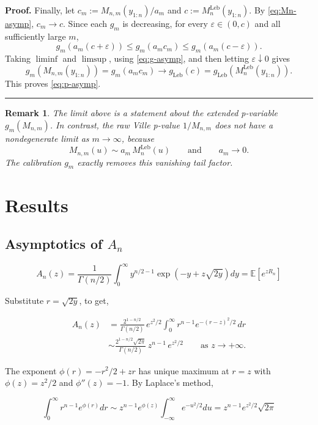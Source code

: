 \documentclass{article}%
\newtheorem{remark}[theorem]{Remark}
\newenvironment{proof}[1][Proof]{\noindent\textbf{#1.} }{\ \rule{0.5em}{0.5em}}
\begin{document}
\begin{proof}
Finally, let $c_m:=M_{n,m}(y_{1:n})/a_m$ and $c:=M_n^{\mathrm{Leb}}(y_{1:n})$. By \eqref{eq:Mn-asymp}, $c_m\to c$. Since each $g_m$ is decreasing, for every $\varepsilon\in(0,c)$ and all sufficiently large $m$,
\[
g_m(a_m(c+\varepsilon))
\le
g_m(a_m c_m)
\le
g_m(a_m(c-\varepsilon)).
\]
Taking $\liminf$ and $\limsup$, using \eqref{eq:g-asymp}, and then letting $\varepsilon\downarrow 0$ gives
\[
g_m(M_{n,m}(y_{1:n}))
=
g_m(a_m c_m)
\longrightarrow
g_{\mathrm{Leb}}(c)
=
g_{\mathrm{Leb}}(M_n^{\mathrm{Leb}}(y_{1:n})).
\]
This proves \eqref{eq:p-asymp}.
\end{proof}

\begin{remark}
The limit above is a statement about the \emph{extended} p-variable $g_m(M_{n,m})$. In contrast, the raw Ville p-value $1/M_{n,m}$ does \emph{not} have a nondegenerate limit as $m\to\infty$, because
\[
M_{n,m}(u)\sim a_m\,M_n^{\mathrm{Leb}}(u)
\qquad\text{and}\qquad a_m\to 0.
\]
The calibration $g_m$ exactly removes this vanishing tail factor.
\end{remark}




\section{Results}

\subsection{Asymptotics of $A_n$}\label{sec:asymp_An}

\[
A_n(z)=\frac{1}{\Gamma(n/2)}\int_0^\infty y^{n/2-1}\exp(-y+z\sqrt{2y})dy=\mathbb E[e^{z R_n}]
\]

Substitute $r = \sqrt{2y}$, to get,

\begin{align*}
A_n(z)&=\frac{2^{1-n/2}}{\Gamma(n/2)}\,e^{z^2/2}\int_0^\infty r^{n-1}e^{-(r-z)^2/2}\,dr\\
&\sim \frac{2^{1-n/2}\sqrt{2\pi}}{\Gamma(n/2)}\,z^{n-1}\,e^{z^2/2}\qquad\text{as }z\to+\infty.
\end{align*}

The exponent $\phi(r) = -r^2/2 + zr$ has unique maximum at $r = z$ with $\phi(z) = z^2/2$ and $\phi''(z) = -1$.  By Laplace's method,

\[
\int_{0}^\infty r^{n-1} e^{\phi(r)} dr \sim z^{n-1} e^{\phi(z)} \int_{-\infty}^\infty  e^{-u^2/2} du = z^{n-1} e^{z^2/2} \sqrt{2\pi} 
\]
\end{document}
